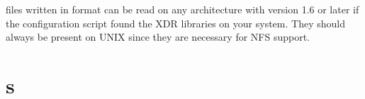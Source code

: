 {\gromacs} files written in  format can be read on any
architecture with {\gromacs} version 1.6 or later if the configuration
script found the XDR libraries on your system. They should always be
present on UNIX since they are necessary for NFS support.



\section{s}


\section{}

